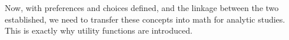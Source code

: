 Now, with preferences and choices defined, and the linkage between the two established, we need to transfer these concepts into math for analytic studies.
This is exactly why utility functions are introduced.

